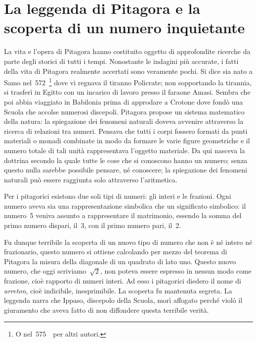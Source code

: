 
\section{La leggenda di Pitagora e la scoperta di un numero inquietante}

La vita e l'opera di Pitagora hanno costituito oggetto
di approfondite ricerche da parte degli storici di tutti i tempi.
Nonostante le indagini più accurate, i fatti della vita di Pitagora
realmente accertati sono veramente pochi. Si dice sia nato a Samo 
nel~572~\aC\footnote{O nel~575~\aC\ per altri autori.} dove vi regnava il 
tiranno Policrate; non sopportando la tirannia, si trasferì in Egitto con 
un incarico di lavoro presso il faraone Amasi. Sembra che poi abbia
viaggiato in Babilonia prima di approdare a Crotone dove fondò una
Scuola che accolse numerosi discepoli. Pitagora propose un sistema
matematico della natura: la spiegazione dei fenomeni naturali doveva
avvenire attraverso la ricerca di relazioni tra numeri. Pensava che
tutti i corpi fossero formati da punti materiali o monadi combinate in
modo da formare le varie figure geometriche e il numero totale di tali
unità rappresentava l'oggetto materiale. Da qui
nasceva la dottrina secondo la quale tutte le cose che si conoscono
hanno un numero; senza questo nulla sarebbe possibile pensare, né
conoscere; la spiegazione dei fenomeni naturali può essere raggiunta
solo attraverso l'aritmetica.

Per i pitagorici esistono due soli tipi di numeri: gli interi e le
frazioni. Ogni numero aveva sia una rappresentazione simbolica che un
significato simbolico: il numero~5 veniva assunto a rappresentare il
matrimonio, essendo la somma del primo numero dispari, il~3, con il
primo numero pari, il~2.

Fu dunque terribile la scoperta di un nuovo tipo di numero che non è
né intero né frazionario, questo numero si ottiene calcolando per
mezzo del teorema di Pitagora la misura della diagonale di un quadrato
di lato uno. Questo nuovo numero, che oggi scriviamo~$\sqrt{2}$, non
poteva essere espresso in nessun modo come frazione, cioè rapporto di
numeri interi. Ad esso i pitagorici diedero il nome di
\emph{arreton}, cioè indicibile, inesprimibile. La scoperta fu
mantenuta segreta. La leggenda narra che Ippaso, discepolo della
Scuola, morì affogato perché violò il giuramento che aveva fatto
di non diffondere questa terribile verità.

